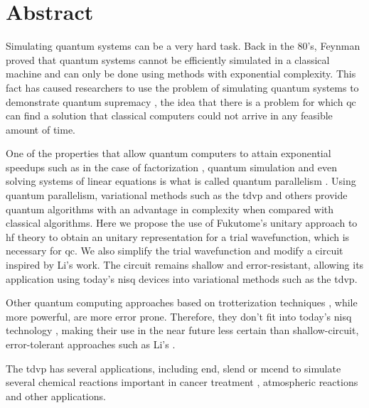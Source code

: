 \documentclass{aux/ttuthes2007}
\begin{document}
\chapter{\textbf{Abstract}}

Simulating quantum systems can be a very hard task. Back in the 80's, Feynman  proved that quantum systems cannot be efficiently simulated in a classical machine and can only be done using methods with exponential complexity. 
This fact has caused researchers to use the problem of simulating quantum systems to demonstrate quantum supremacy , the idea that there is a problem for which \gls{qc} can find a solution that classical computers could not arrive in any feasible amount of time.

One of the properties that allow quantum computers to attain exponential speedups such as in the case of factorization , quantum simulation  and even solving systems of linear equations  is what is called quantum parallelism .
Using quantum parallelism, variational methods such as the \gls{tdvp} and others  provide quantum algorithms with an advantage in complexity when compared with classical algorithms.
Here we propose the use of Fukutome's  unitary approach to \gls{hf} theory to obtain an unitary representation for a trial wavefunction, which is necessary for \gls{qc}.
We also simplify the trial wavefunction and modify a circuit inspired by Li's  work. The circuit remains shallow and error-resistant, allowing its application using today's \gls{nisq} devices into variational methods such as the \gls{tdvp}.

Other quantum computing approaches based on trotterization techniques , while more powerful, are more error prone. Therefore, they don't fit into today's \gls{nisq} technology , making their use in the near future less certain than shallow-circuit, error-tolerant approaches such as Li's .

The \gls{tdvp} has several applications, including \gls{end}, \gls{slend} or \gls{mcend} to simulate several chemical reactions important in cancer treatment , atmospheric reactions  and other applications.

\end{document}
